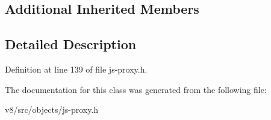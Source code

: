 \subsection*{Additional Inherited Members}


\subsection{Detailed Description}


Definition at line 139 of file js-\/proxy.\+h.



The documentation for this class was generated from the following file\+:\begin{DoxyCompactItemize}
\item 
v8/src/objects/js-\/proxy.\+h\end{DoxyCompactItemize}
